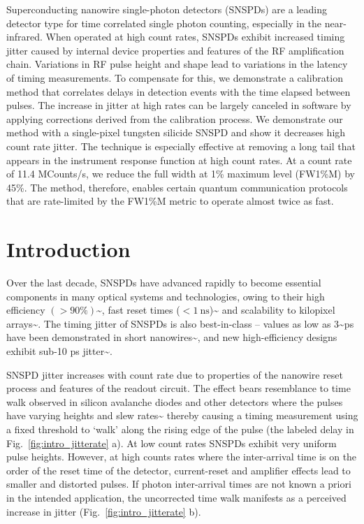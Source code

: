\documentclass[11pt]{caltech_thesis} %
\begin{document}
Superconducting nanowire single-photon detectors (SNSPDs) are a leading
detector type for time correlated single photon counting, especially in
the near-infrared. When operated at high count rates, SNSPDs exhibit
increased timing jitter caused by internal device properties and
features of the RF amplification chain. Variations in RF pulse height
and shape lead to variations in the latency of timing measurements. To
compensate for this, we demonstrate a calibration method that correlates
delays in detection events with the time elapsed between pulses. The
increase in jitter at high rates can be largely canceled in software by
applying corrections derived from the calibration process. We
demonstrate our method with a single-pixel tungsten silicide SNSPD and
show it decreases high count rate jitter. The technique is especially
effective at removing a long tail that appears in the instrument
response function at high count rates. At a count rate of 11.4
MCounts/s, we reduce the full width at 1\% maximum level (FW1\%M) by
45\%. The method, therefore, enables certain quantum communication
protocols that are rate-limited by the FW1\%M metric to operate almost
twice as fast.

\hypertarget{introduction-1}{%
\section{Introduction}\label{introduction-1}}

Over the last decade, SNSPDs have advanced rapidly to become essential
components in many optical systems and technologies, owing to their high
efficiency
$(>90\%)$\textasciitilde{}\autocite{99.5_Chang_2021,reddy2020superconducting},
fast reset times
($< 1~\mathrm{ns}$)\textasciitilde{}\autocite{Vetter2016Cavity} and
scalability to kilopixel
arrays\textasciitilde{}\autocite{WollWollman2019}. The timing jitter of
SNSPDs is also best-in-class -- values as low as 3\textasciitilde ps
have been demonstrated in short
nanowires\textasciitilde{}\autocite{Korzh2020}, and new high-efficiency
designs exhibit sub-10 ps
jitter\textasciitilde{}\autocite{EsmaeilZadeh2020,Colangelo2021}.

SNSPD jitter increases with count rate due to properties of the nanowire
reset process and features of the readout circuit. The effect bears
resemblance to time walk observed in silicon avalanche diodes and other
detectors where the pulses have varying heights and slew
rates\textasciitilde{}\autocite{SPAD_walk_Kirchnir_1997} thereby causing
a timing measurement using a fixed threshold to `walk' along the rising
edge of the pulse (the labeled delay in Fig.~\ref{fig:intro_jitterate}
a). At low count rates SNSPDs exhibit very uniform pulse heights.
However, at high counts rates where the inter-arrival time is on the
order of the reset time of the detector, current-reset and amplifier
effects lead to smaller and distorted pulses. If photon inter-arrival
times are not known a priori in the intended application, the
uncorrected time walk manifests as a perceived increase in jitter
(Fig.~\ref{fig:intro_jitterate} b).
\end{document}
